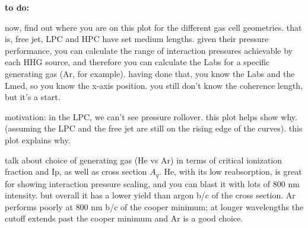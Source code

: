 \textbf{to do:}

now, find out where you are on this plot for the different gas cell geometries. that is, free jet, LPC and HPC have set medium lengths. given their pressure performance, you can calculate the range of interaction pressures achievable by each HHG source, and therefore you can calculate the Labs for a specific generating gas (Ar, for example). having done that, you know the Labs and the Lmed, so you know the x-axis position. you still don't know the coherence length, but it's a start.

motivation: in the LPC, we can't see pressure rollover. this plot helps show why. (assuming the LPC and the free jet are still on the rising edge of the curves). this plot explains why.

talk about choice of generating gas (He vs Ar) in terms of critical ionization fraction and Ip, as well as cross section $A_q$. He, with its low reabsorption, is great for showing interaction pressure scaling, and you can blast it with lots of 800 nm intensity. but overall it has a lower yield than argon b/c of the cross section. Ar performs poorly at 800 nm b/c of the cooper minimum; at longer wavelengths the cutoff extends past the cooper minimum and Ar is a good choice.